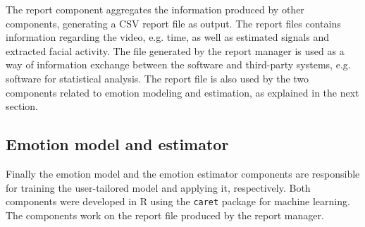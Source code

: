 The report component aggregates the information produced by other components, generating a CSV report file as output. The report files contains information regarding the video, e.g. time, as well as estimated signals and extracted facial activity. The file generated by the report manager is used as a way of information exchange between the software and third-party systems, e.g. software for statistical analysis. The report file is also used by the two components related to emotion modeling and estimation, as explained in the next section.

\subsection{Emotion model and estimator}

Finally the emotion model and the emotion estimator components are responsible for training the user-tailored model and applying it, respectively. Both components were developed in R using the \texttt{caret} package for machine learning. The components work on the report file produced by the report manager.
